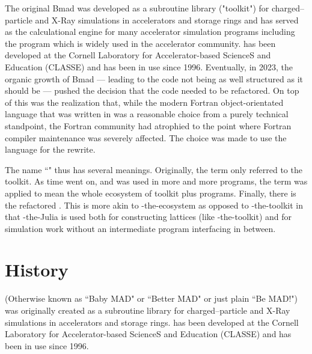 The original Bmad was developed as a subroutine
library ("toolkit") for charged--particle and X-Ray simulations in accelerators and storage rings and 
has served as the calculational engine
for many accelerator simulation programs including the \tao program which is widely used in the
accelerator community. \bmad has
been developed at the Cornell Laboratory for Accelerator-based ScienceS and Education (CLASSE) and
has been in use since 1996.
Eventually, in 2023, the organic growth of Bmad --- leading to the code not being as well structured
as it should be --- pushed the decision that the code needed to be
refactored. On top of this was the realization that, while the modern Fortran object-orientated
language that \bmad was written in was a reasonable choice from a purely technical standpoint, 
the Fortran community had atrophied to the point where Fortran compiler maintenance was severely 
affected. The choice was made to use the \julia language for the rewrite.

The name ``\bmad" thus has several meanings. Originally, the term only referred to the \bmad
toolkit. As time went on, and \bmad was used in more and more programs, the term \bmad was
applied to mean the whole ecosystem of toolkit plus programs. Finally, there is the refactored \julia
\bmad. This \bmad is more akin to \bmad-the-ecosystem as
opposed to \bmad-the-toolkit in that \bmad-the-Julia is used both for constructing lattices
(like \bmad-the-toolkit) and for simulation work without an intermediate program interfacing in between.

\section{History}

\bmad (Otherwise known as ``Baby MAD" or ``Better MAD" or just plain ``Be MAD!") was originally created as
a subroutine
library for charged--particle and X-Ray simulations in accelerators and storage rings. \bmad has
been developed at the Cornell Laboratory for Accelerator-based ScienceS and Education (CLASSE) and
has been in use since 1996.

